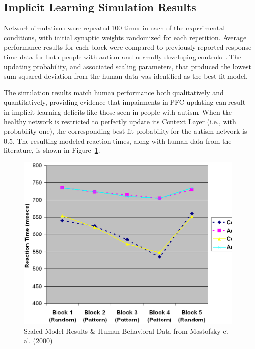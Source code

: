 \subsection{Implicit Learning Simulation Results}
Network simulations were repeated 100 times in each of the experimental conditions, with initial synaptic weights randomized for each repetition.  Average performance results for each block were compared to previously reported response time data for both people with autism and normally developing controls~\cite{RefWorks:148}.  The updating probability, and associated scaling parameters, that produced the lowest sum-squared deviation from the human data was identified as the best fit model.

The simulation results match human performance both qualitatively and quantitatively, providing evidence that impairments in PFC updating can result in implicit learning deficits like those seen in people with autism.  When the healthy network is restricted to perfectly update its Context Layer (i.e., with probability one), the corresponding best-fit probability for the autism network is $0.5$. The resulting modeled reaction times, along with human data from the literature, is shown in Figure~\ref{Model-Results}.

\begin{figure}[t]
\begin{center}
	\includegraphics[width=115mm]{graphs/srtt_chart.ps}
\end{center}
\caption{Scaled Model Results \& Human Behavioral Data from Mostofsky
         et al. (2000)} 
\label{Model-Results}
\end{figure} 

